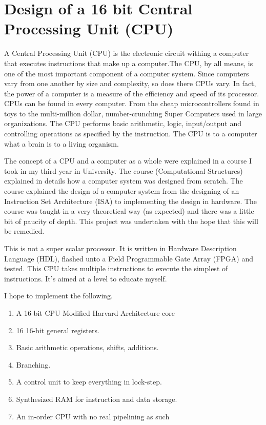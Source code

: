 \section{Design of a 16 bit Central Processing Unit (CPU)} 
A Central Processing Unit (CPU) is the electronic circuit withing a computer that executes instructions that make up a computer.The CPU, by all means, is one of the most important component of a computer system. Since computers vary from one another by size and complexity, so does there CPUs vary. In fact, the power of a computer is a measure of the efficiency and speed of its processor. CPUs can be found in every computer. From the cheap microcontrollers found in toys to the multi-million dollar, number-crunching Super Computers used in large organizations.  The CPU performs basic arithmetic, logic, input/output and controlling operations as specified by the instruction. The CPU is to a computer what a brain is to a living organism.

The concept of a CPU and a computer as a whole were explained in a course I took in my third year in University. The course (Computational Structures) explained in details how a computer system was designed from scratch. The course explained the design of a computer system from  the designing of an Instruction Set Architecture (ISA) to implementing the design in hardware. The course was taught in a very theoretical way (as expected) and there was a little bit of paucity of depth. This project was undertaken with the hope that this will be remedied.

This is not a super scalar processor. It is written in Hardware Description Language (HDL), flashed unto a Field Programmable Gate Array (FPGA) and tested. This CPU takes multiple instructions to execute the simplest of instructions. It’s aimed at a level to educate myself.

I hope to implement the following.
\begin{enumerate}
\item A 16-bit CPU Modified Harvard Architecture core
\item 16 16-bit general registers.
\item Basic arithmetic operations, shifts, additions.
\item Branching.
\item A control unit to keep everything in lock-step.
\item Synthesized RAM for instruction and data storage.
\item An in-order CPU with no real pipelining as such
\end{enumerate}

